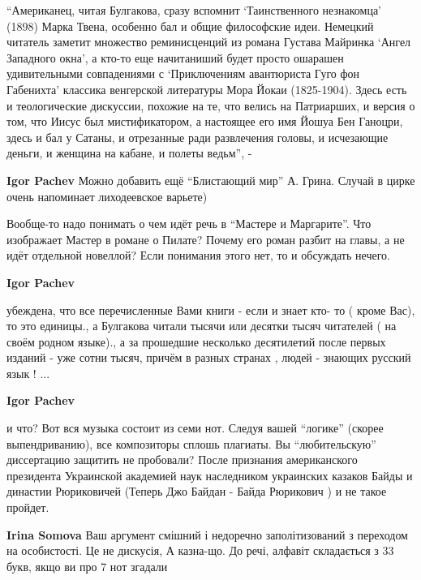 \begin{itemize}
\enquote{Американец, читая Булгакова, сразу вспомнит \enquote{Таинственного
незнакомца} (1898) Марка Твена, особенно бал и общие философские идеи. Немецкий
читатель заметит множество реминисценций из романа Густава Майринка
\enquote{Ангел Западного окна}, а кто-то еще начитаниший будет просто ошарашен
удивительными совпадениями с \enquote{Приключениям авантюриста Гуго фон
Габенихта} классика венгерской литературы Мора Йокаи (1825-1904). Здесь есть и
теологические дискуссии, похожие на те, что велись на Патриарших, и версия о
том, что Иисус был мистификатором, а настоящее его имя Йошуа Бен Ганоцри, здесь
и бал у Сатаны, и отрезанные ради развлечения головы, и исчезающие деньги, и
женщина на кабане, и полеты ведьм},
-

\begin{itemize} %
\textbf{Igor Pachev} Можно добавить ещё \enquote{Блистающий мир} А. Грина. Случай в цирке очень напоминает лиходеевское варьете)


Вообще-то надо понимать о чем идёт речь в \enquote{Мастере и Маргарите}. Что изображает
Мастер в романе о Пилате? Почему его роман разбит на главы, а не идёт отдельной
новеллой? Если понимания этого нет, то и обсуждать нечего.

\textbf{Igor Pachev} 

убеждена, что все перечисленные Вами книги - если и знает кто- то ( кроме Вас),
то это единицы., а Булгакова читали тысячи или десятки тысяч читателей ( на
своём родном языке)., а за прошедшие несколько десятилетий после первых изданий
- уже сотни тысяч, причём в разных странах , людей - знающих русский язык ! ...


\textbf{Igor Pachev} 

и что? Вот вся музыка состоит из семи нот. Следуя вашей \enquote{логике} (скорее
выпендриванию), все композиторы сплошь плагиаты. Вы \enquote{любительскую} диссертацию
защитить не пробовали? После признания американского президента Украинской
академией наук наследником украинских казаков Байды и династии Рюриковичей
(Теперь Джо Байдан - Байда Рюрикович ) и не такое пройдет.

\begin{itemize} %
\textbf{Irina Somova} Ваш аргумент смішний і недоречно заполітизований з переходом на особистості. Це не дискусія, А казна-що. До речі, алфавіт складається з 33 букв, якщо ви про 7 нот згадали
\end{itemize} %


\end{itemize}
\end{itemize}

